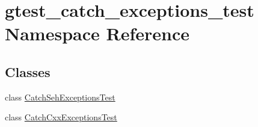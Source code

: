 \hypertarget{namespacegtest__catch__exceptions__test}{\section{gtest\-\_\-catch\-\_\-exceptions\-\_\-test \-Namespace \-Reference}
\label{dd/dbf/namespacegtest__catch__exceptions__test}
}
\subsection*{\-Classes}
\begin{DoxyCompactItemize}
\item 
class \hyperlink{classgtest__catch__exceptions__test_1_1CatchSehExceptionsTest}{\-Catch\-Seh\-Exceptions\-Test}
\item 
class \hyperlink{classgtest__catch__exceptions__test_1_1CatchCxxExceptionsTest}{\-Catch\-Cxx\-Exceptions\-Test}
\end{DoxyCompactItemize}
